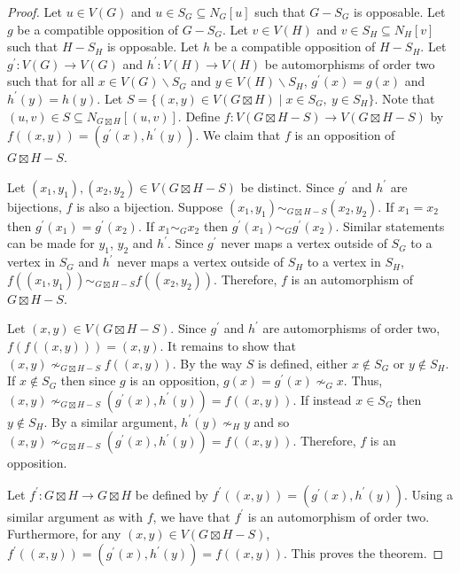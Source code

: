 \documentclass[11pt]{article}
\theoremstyle{definition}
\begin{document}
\begin{proof}
    Let $u\in V(G)$ and $u\in S_G\subseteq N_G[u]$ such that $G-S_G$ is
    opposable. Let $g$ be a compatible opposition of $G-S_G$. Let $v\in V(H)$
    and $v\in S_H \subseteq N_H[v]$ such that $H-S_H$ is opposable. Let $h$ be
    a compatible opposition of $H-S_H$. Let $g^\prime :V(G) \to V(G)$ and
    $h^\prime : V(H) \to V(H)$ be automorphisms of order two such that for all
    $x \in V(G) \backslash S_G$ and $y\in V(H) \backslash S_H$, $g^\prime(x) =
    g(x)$ and $h^\prime(y) = h(y)$. Let $S = \{(x,y) \in V(G\boxtimes H)\mid
    x\in S_G, \ y\in S_H\}$. Note that $(u,v) \in S\subseteq N_{G\boxtimes
    H}[(u,v)]$. Define $f: V(G\boxtimes H - S) \to V(G\boxtimes H - S)$ by
    $f((x,y)) = (g^\prime(x), h^\prime(y))$. We claim that $f$ is an opposition
    of $G\boxtimes H - S$.

    Let $(x_1, y_1), (x_2, y_2) \in V(G\boxtimes H - S)$ be distinct. Since
    $g^\prime$ and $h^\prime$ are bijections, $f$ is also a bijection. Suppose
    $(x_1, y_1) \sim_{G\boxtimes H - S} (x_2, y_2)$. If $x_1 = x_2$ then
    $g^\prime (x_1) = g^\prime (x_2)$. If $x_1 \sim_G x_2$ then $g^\prime (x_1)
    \sim_G g^\prime(x_2)$. Similar statements can be made for $y_1$, $y_2$ and
    $h^\prime$. Since $g^\prime$ never maps a vertex outside of $S_G$ to a
    vertex in $S_G$ and $h^\prime$ never maps a vertex outside of $S_H$ to a
    vertex in $S_H$, $f((x_1, y_1)) \sim_{G\boxtimes H - S} f((x_2, y_2))$.
    Therefore, $f$ is an automorphism of $G\boxtimes H - S$.

    Let $(x,y) \in V(G\boxtimes H - S)$. Since $g^\prime$ and $h^\prime$ are
    automorphisms of order two, $f(f((x,y))) = (x,y)$. It remains to show that
    $(x,y) \nsim_{G\boxtimes H - S} f((x,y))$. By the way $S$ is defined,
    either $x\notin S_G$ or $y\notin S_H$. If $x\notin S_G$ then since $g$ is
    an opposition, $g(x) = g^\prime (x) \nsim_G x$. Thus, $(x,y)
    \nsim_{G\boxtimes H - S} (g^\prime(x), h^\prime(y)) = f((x,y))$. If instead
    $x\in S_G$ then $y\notin S_H$. By a similar argument, $h^\prime (y) \nsim_H
    y$ and so $(x,y) \nsim_{G\boxtimes H - S} (g^\prime(x), h^\prime(y)) =
    f((x,y))$. Therefore, $f$ is an opposition. 

    Let $f^\prime : G\boxtimes H \to G\boxtimes H$ be defined by
    $f^\prime((x,y)) = (g^\prime(x), h^\prime(y))$. Using a similar argument as
    with $f$, we have that $f^\prime$ is an automorphism of order two.
    Furthermore, for any $(x,y) \in V(G\boxtimes H - S)$, $f^\prime((x,y)) =
    (g^\prime(x), h^\prime(y)) = f((x,y))$. This proves the theorem. 
\end{proof}
\end{document}
